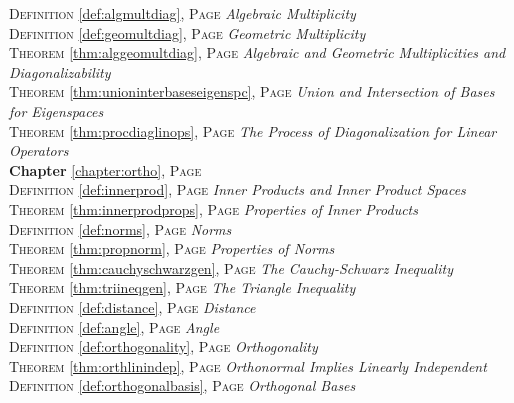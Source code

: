 \begin{multicols}{2}
{\textsc{Definition} \ref{def:algmultdiag}, \textsc{Page} \pageref{def:algmultdiag} \textit{Algebraic Multiplicity} \\
\textsc{Definition} \ref{def:geomultdiag}, \textsc{Page} \pageref{def:geomultdiag} \textit{Geometric Multiplicity} \\
\textsc{Theorem} \ref{thm:alggeomultdiag}, \textsc{Page} \pageref{thm:alggeomultdiag} \textit{Algebraic and Geometric Multiplicities and Diagonalizability} \\
\textsc{Theorem} \ref{thm:unioninterbaseseigenspc}, \textsc{Page} \pageref{thm:unioninterbaseseigenspc} \textit{Union and Intersection of Bases for Eigenspaces} \\
\textsc{Theorem} \ref{thm:procdiaglinops}, \textsc{Page} \pageref{thm:procdiaglinops} \textit{The Process of Diagonalization for Linear Operators} \\
\textbf{Chapter} \ref{chapter:ortho}, \textsc{Page} \pageref{chapter:ortho} \\
\textsc{Definition} \ref{def:innerprod}, \textsc{Page} \pageref{def:innerprod} \textit{Inner Products and Inner Product Spaces} \\
\textsc{Theorem} \ref{thm:innerprodprops}, \textsc{Page} \pageref{thm:innerprodprops} \textit{Properties of Inner Products} \\
\textsc{Definition} \ref{def:norms}, \textsc{Page} \pageref{def:norms} \textit{Norms} \\
\textsc{Theorem} \ref{thm:propnorm}, \textsc{Page} \pageref{thm:propnorm} \textit{Properties of Norms} \\
\textsc{Theorem} \ref{thm:cauchyschwarzgen}, \textsc{Page} \pageref{thm:cauchyschwarzgen} \textit{The Cauchy-Schwarz Inequality} \\
\textsc{Theorem} \ref{thm:triineqgen}, \textsc{Page} \pageref{thm:triineqgen} \textit{The Triangle Inequality} \\
\textsc{Definition} \ref{def:distance}, \textsc{Page} \pageref{def:distance} \textit{Distance} \\
\textsc{Definition} \ref{def:angle}, \textsc{Page} \pageref{def:angle} \textit{Angle} \\
\textsc{Definition} \ref{def:orthogonality}, \textsc{Page} \pageref{def:orthogonality} \textit{Orthogonality} \\
\textsc{Theorem} \ref{thm:orthlinindep}, \textsc{Page} \pageref{thm:orthlinindep} \textit{Orthonormal Implies Linearly Independent} \\
\textsc{Definition} \ref{def:orthogonalbasis}, \textsc{Page} \pageref{def:orthogonalbasis} \textit{Orthogonal Bases} \\
}
\end{multicols}
